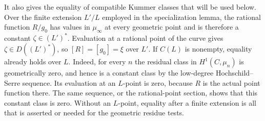 It also gives the equality of compatible Kummer classes that will
be used below. Over the finite extension $L'/L$ employed in the
specialization lemma, the rational function $R/g_0$ has values in
$\mu_\infty$ at every geometric point and is therefore a constant
$\zeta\in(L')^*$. Evaluation at a rational point of the curve gives
$\zeta\in D((L')^*)$, so $[R]=[g_0]=\xi$ over $L'$.
If $C(L)$ is nonempty, equality already holds over $L$. Indeed,
for every $n$ the residual class in $H^1(C,\mu_n)$ is geometrically
zero, and hence is a constant class by the low-degree
Hochschild--Serre sequence. Its evaluation at an $L$-point is zero,
because $R$ is the actual point function there. The same sequence,
or the rational-point section, shows that this constant class is
zero. Without an $L$-point, equality after a finite extension is all
that is asserted or needed for the geometric residue tests.
